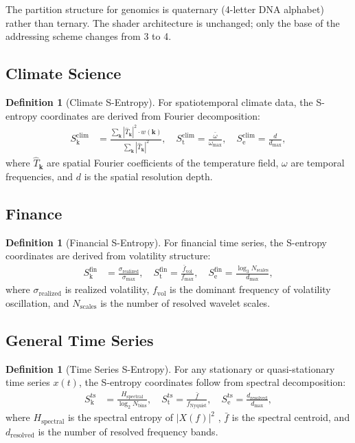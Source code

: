 \documentclass[11pt,twocolumn,a4paper]{article}
\theoremstyle{definition}
\newtheorem{definition}[theorem]{Definition}
\theoremstyle{remark}
\newcommand{\Sk}{S_{\mathrm{k}}}
\newcommand{\St}{S_{\mathrm{t}}}
\newcommand{\Se}{S_{\mathrm{e}}}
\begin{document}
The partition structure for genomics is quaternary (4-letter DNA alphabet) rather than ternary. The shader architecture is unchanged; only the base of the addressing scheme changes from 3 to 4.

\subsection{Climate Science}

\begin{definition}[Climate S-Entropy]
For spatiotemporal climate data, the S-entropy coordinates are derived from Fourier decomposition:
\begin{align}
\Sk^{\mathrm{clim}} &= \frac{\sum_{\mathbf{k}} |\hat{T}_{\mathbf{k}}|^2 \cdot w(\mathbf{k})}{\sum_{\mathbf{k}} |\hat{T}_{\mathbf{k}}|^2}, \quad \St^{\mathrm{clim}} = \frac{\bar{\omega}}{\omega_{\max}}, \quad \Se^{\mathrm{clim}} = \frac{d}{d_{\max}},
\end{align}
where $\hat{T}_{\mathbf{k}}$ are spatial Fourier coefficients of the temperature field, $\omega$ are temporal frequencies, and $d$ is the spatial resolution depth.
\end{definition}

\subsection{Finance}

\begin{definition}[Financial S-Entropy]
For financial time series, the S-entropy coordinates are derived from volatility structure:
\begin{align}
\Sk^{\mathrm{fin}} &= \frac{\sigma_{\mathrm{realized}}}{\sigma_{\max}}, \quad \St^{\mathrm{fin}} = \frac{\bar{f}_{\mathrm{vol}}}{{f}_{\max}}, \quad \Se^{\mathrm{fin}} = \frac{\log_3 N_{\mathrm{scales}}}{d_{\max}},
\end{align}
where $\sigma_{\mathrm{realized}}$ is realized volatility, $f_{\mathrm{vol}}$ is the dominant frequency of volatility oscillation, and $N_{\mathrm{scales}}$ is the number of resolved wavelet scales.
\end{definition}

\subsection{General Time Series}

\begin{definition}[Time Series S-Entropy]
For any stationary or quasi-stationary time series $x(t)$, the S-entropy coordinates follow from spectral decomposition:
\begin{align}
\Sk^{\mathrm{ts}} &= \frac{H_{\mathrm{spectral}}}{\log_2 N_{\mathrm{bins}}}, \quad \St^{\mathrm{ts}} = \frac{\bar{f}}{{f}_{\mathrm{Nyquist}}}, \quad \Se^{\mathrm{ts}} = \frac{d_{\mathrm{resolved}}}{d_{\max}},
\end{align}
where $H_{\mathrm{spectral}}$ is the spectral entropy of $|X(f)|^2$ \citep{shannon1948}, $\bar{f}$ is the spectral centroid, and $d_{\mathrm{resolved}}$ is the number of resolved frequency bands.
\end{definition}
\end{document}
